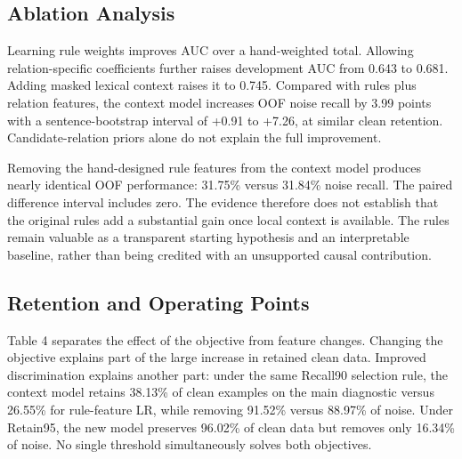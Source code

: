 \documentclass[11pt]{article}
\begin{document}
\subsection{Ablation Analysis}

Learning rule weights improves AUC over a hand-weighted total. Allowing relation-specific coefficients further raises development AUC from 0.643 to 0.681. Adding masked lexical context raises it to 0.745. Compared with rules plus relation features, the context model increases OOF noise recall by 3.99 points with a sentence-bootstrap interval of +0.91 to +7.26, at similar clean retention. Candidate-relation priors alone do not explain the full improvement.

Removing the hand-designed rule features from the context model produces nearly identical OOF performance: 31.75\% versus 31.84\% noise recall. The paired difference interval includes zero. The evidence therefore does not establish that the original rules add a substantial gain once local context is available. The rules remain valuable as a transparent starting hypothesis and an interpretable baseline, rather than being credited with an unsupported causal contribution.

\subsection{Retention and Operating Points}

\begin{table}[t]\centering\small
{}
\caption{Operating-point comparison; test denotes the main diagnostic.}
\end{table}

Table 4 separates the effect of the objective from feature changes. Changing the objective explains part of the large increase in retained clean data. Improved discrimination explains another part: under the same Recall90 selection rule, the context model retains 38.13\% of clean examples on the main diagnostic versus 26.55\% for rule-feature LR, while removing 91.52\% versus 88.97\% of noise. Under Retain95, the new model preserves 96.02\% of clean data but removes only 16.34\% of noise. No single threshold simultaneously solves both objectives.
\end{document}
